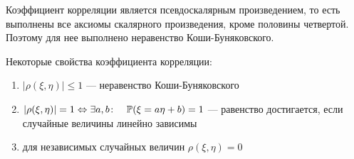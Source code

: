 \documentclass[../TV&MS.tex]{subfiles}
\begin{document}
Коэффициент корреляции является псевдоскалярным произведением, то есть выполнены все аксиомы скалярного произведения, кроме половины четвертой. Поэтому для нее выполнено неравенство Коши-Буняковского.

Некоторые свойства коэффициента корреляции:
\begin{enumerate}
	\item $|\rho(\xi, \eta)| \le 1$ --- неравенство Коши-Буняковского
	\item $|\rho(\xi, \eta)| = 1 \Leftrightarrow \exists a, b \colon \quad \mathbb{P}(\xi = a\eta + b) = 1$ --- равенство достигается, если случайные величины линейно зависимы
	\item для независимых случайных величин $\rho(\xi, \eta) = 0$
\end{enumerate} 



\newpage
\end{document}
